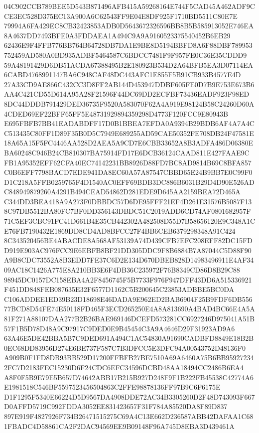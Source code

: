 \documentclass[UTF8,fontset=fandol,zihao=-4,a4paper]{ctexart}
\begin{document}
{{04C902CCB789BEE5D543B871496AFB415A59268164E744F5CAD45A462ADF9CCE3EC528D375EC13A900A6C62543FF9E04E8DF925F1710BD5511C80E7E
79994A6FA429EC8CB32423853ADB0D5643672326596BB8B5B585913052E746EA8A4637DD7493BFE0A3FDDAEA1A494C9A9A9160523375540452B6EB29
62436E9F4FFB776BB764B64728DB7DA1E9BE8D5194BBFD8A6F88DBF789953752459AD580A0BD935ADBF5464587C6BDCC7481F9F957FE0C36E35CDDD9
59A48191429D6DB51ACDA67388495B2E180923B534D2A64BFB5EA3D07114EA6CABD4768991147BA6C948CAF48DC443AFC1E855F5B91CB933B4577E4D
27A33CD9AE866C432CC3D8FF2AB144D453947DDBF605FE0D7B9E753E673B6AA4C421CD55D614A95A28F21596F44DC69DD2ECFBF73436EADF923F98ED
8DC44DDDB791429DED36735F9520A583070F62A4A919E98124B58C24260D60A4CDED69EF22BFF65FF5E48731929894359298D4773F120FCC9E80943B
E695FBFB7BB41EADABDFF17D0B1BBEA7EFDA0A9394B29BDB6AF4A7A4CC513435C80FF1D89F35B0D5C7949E689255AD59CAE50352FE708DB24F47581E
18A65A15F5FC4446AA528D2AEA5A9CD7E6CBB33652A8B3ADFA486D06380EBA60248C946B24CB810307BA75914FD17E6DCB36124CAAD811E427FAAE9C
FB1A95352EFF62CFA40EC74142231BB8926D88FD7BC8AD9814B69C8BFA857C0B6EFF7798BACD7EDE941DA8EC60A57A87547CBBD65E24B9BB7E0C99F0
D1C218A5FFB0259765F4D1540AC0EFF69BDB3DC886B6031B29D4D90E526ADC848949879260A4291B494CEAD54862D281EDE9D645AA2159BEA72D465A
C344DD3BEA418A9A273F0DBBDC57D6DE95FFF21EF4D261E31576B5087F138C97DB5512BA80FC7BF0DD356143DBDC51C2019ADD6CD74AF0801682957F
71C5EF3CBC91FC41D661B4E35CB442302A482508D55D7B58656120E9C348A1CE76FB7190432E1869DD8CD4AD8BFCC27F4BB6CEB6379298348A91C424
8C343520456BE4ABACDE8A568AF53139A74D439CFB7EFC208EFF82DC15FDD919E903AC976FCC9E6EBFB8BF21DD305DDC9F8B6884B7A87044C5D88F90
A9B8CDC73552A8B3EDD7FE37C6D2E134D670DBEB828D14983496911E4AF3409AC18C1426A775E8A210BB3E6F4DB36C235972F76B8349CD86D8B29C88
98945DC0157DC158EBA4A2F8456745F5B7733F976F947DFF43DD6A515336921F451DD848FEB087635E32F6577D1162C5B200645C23853ADBBE5BC0DA
C106ADDEE1ED39B23D18698E46DADA9E962ED2BAB6904F25B9FDF6DB55677BCD8D54FE74E50118FD465F3ECD265250E4A8A813690A4BAD4BC66E4A5A
81F271A88107DAA277B2B26BAE969146DCEFD573281CC6927246D975041A51B57F1B5D78D48A9C97917C9DED0E9B45454C3A9A4646D29F31923AD9A6
63A46E5DE42BBA5B7C9DED691A494C1AC54830A91690CADBFD8849E18B2B0EC68DD83956D274E6BE737F587C7B3DFCC5E3DFC94A00543752D48136F0
A909B0F1FD8DB93BB529D17200FFBFB27BE7510A69A6460A75B6BB959272342FC7D2183FEC15230D6F24CDC6EFC34596DCBD48AA18494CC2486B6EA4
A8F0F5B9E79E5B657D74642ABB17B215B927D248F9F1B222FB45538C42774A6E1981518C546BF5597523456504863C2FFE98878136FF97B9C6F6175E
D1F1295F5340E66224D5D9567DA4908DDE72AC34B3305260D2F48D743093F667D0AFFD5719C992FDDA3052EE831423657F31F784A85520DA8F89D837
897E919F4827926F734B26471515275C69A4C13E662D236587ABB42DAFAA1C681FBADC4D58861CA2F2DAC94569EE9B09148F96A745D8EBA3D439461A
}}
\end{document}
